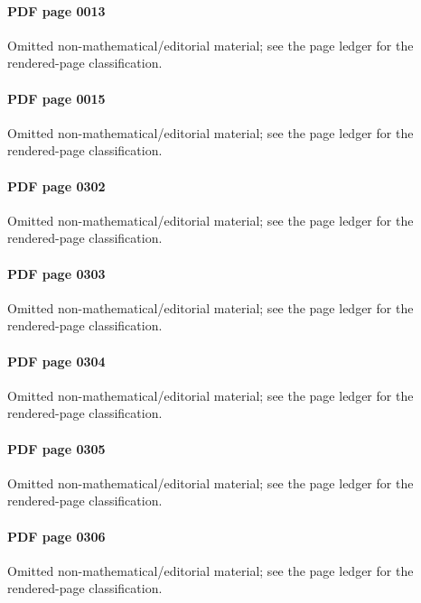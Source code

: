\paragraph{PDF page 0013}\uses{}\label{mcrt-omitted-p0013} Omitted non-mathematical/editorial material; see the page ledger for the rendered-page classification.\par
\paragraph{PDF page 0015}\uses{}\label{mcrt-omitted-p0015} Omitted non-mathematical/editorial material; see the page ledger for the rendered-page classification.\par
\paragraph{PDF page 0302}\uses{}\label{mcrt-omitted-p0302} Omitted non-mathematical/editorial material; see the page ledger for the rendered-page classification.\par
\paragraph{PDF page 0303}\uses{}\label{mcrt-omitted-p0303} Omitted non-mathematical/editorial material; see the page ledger for the rendered-page classification.\par
\paragraph{PDF page 0304}\uses{}\label{mcrt-omitted-p0304} Omitted non-mathematical/editorial material; see the page ledger for the rendered-page classification.\par
\paragraph{PDF page 0305}\uses{}\label{mcrt-omitted-p0305} Omitted non-mathematical/editorial material; see the page ledger for the rendered-page classification.\par
\paragraph{PDF page 0306}\uses{}\label{mcrt-omitted-p0306} Omitted non-mathematical/editorial material; see the page ledger for the rendered-page classification.\par
